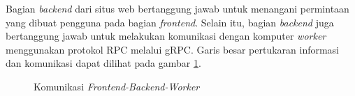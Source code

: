 Bagian \emph{backend} dari situs web bertanggung jawab untuk menangani permintaan
yang dibuat pengguna pada bagian \emph{frontend}. Selain itu, bagian \emph{backend}
juga bertanggung jawab untuk melakukan komunikasi dengan komputer \emph{worker} menggunakan
protokol RPC melalui gRPC. Garis besar pertukaran informasi dan komunikasi
dapat dilihat pada gambar \ref{fig:frontend-backend-worker}.

\begin{figure}[H]
  \centering
  \caption{Komunikasi \emph{Frontend-Backend-Worker}}
  \label{fig:frontend-backend-worker}
\end{figure}
